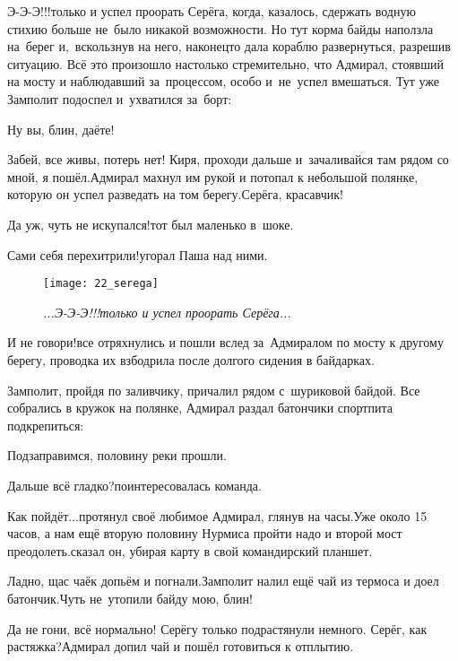 \diagdash Э-Э-Э!!!\mdash только и успел проорать Серёга, когда, казалось, сдержать водную стихию больше не~было никакой возможности. Но тут корма байды наползла на~берег и,~вскользнув на него, наконец\sdash то дала кораблю развернуться, разрешив ситуацию. Всё это произошло настолько стремительно, что Адмирал, стоявший на мосту и наблюдавший за~процессом, особо и~не~успел вмешаться. Тут уже Замполит подоспел и~ухватился за~борт:

\diagdash Ну вы, блин, даёте!

\diagdash Забей, все живы, потерь нет! Киря, проходи дальше и~зачаливайся там рядом со мной, я пошёл.\mdash Адмирал махнул им рукой и потопал к небольшой полянке, которую он успел разведать на том берегу.\mdash Серёга, красавчик!

\diagdash Да уж, чуть не искупался!\mdash тот был маленько в~шоке.

\diagdash Сами себя перехитрили!\mdash угорал Паша над ними.

\setlength{\belowcaptionskip}{-20pt}
\begin{figure}[h]
	\centering
	\texttt{[image: 22\_serega]}
	\caption{\small\textit{...Э-Э-Э!!!\mdash только и успел проорать Серёга...}}
\end{figure}

\diagdash И не говори!\mdash все отряхнулись и пошли вслед за~Адмиралом по мосту к другому берегу, проводка их взбодрила после долгого сидения в байдарках.

Замполит, пройдя по заливчику, причалил рядом с~шуриковой байдой. Все собрались в кружок на полянке, Адмирал раздал батончики спортпита подкрепиться:

\diagdash Подзаправимся, половину реки прошли.

\diagdash Дальше всё гладко?\mdash поинтересовалась команда.

\renewcommand*{\thefootnote}{\fnsymbol{footnote}}
\setcounter{footnote}{0}
\diagdash Как пойдёт$\ldots$\mdash протянул своё любимое Адмирал, глянув на часы.\mdash Уже около 15 часов, а нам ещё вторую половину Нурмиса пройти надо и второй мост преодолеть.\mdash сказал он, убирая карту в свой командирский планшет.

\diagdash Ладно, щас чаёк допьём и погнали.\mdash Замполит налил ещё чай из термоса и доел батончик.\mdash Чуть не~утопили байду мою, блин!

\diagdash Да не гони, всё нормально! Серёгу только подрастянули немного. Серёг, как растяжка?\mdash Адмирал допил чай и пошёл готовиться к отплытию.

